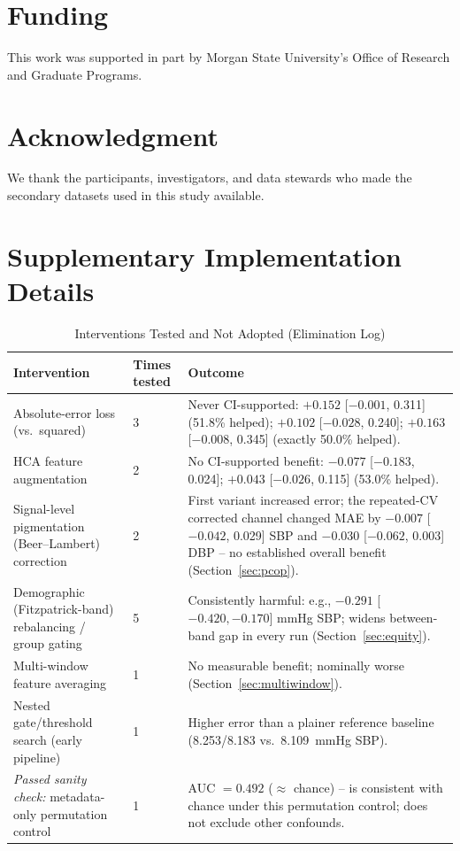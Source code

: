 \documentclass[journal]{IEEEtran}
\begin{document}
\section*{Funding}
This work was supported in part by Morgan State University's Office of Research and Graduate Programs.
\section*{Acknowledgment}
We thank the participants, investigators, and data stewards who made the secondary datasets used in this study available.



\ifdefined\INCLUDECOMBINEDSUPPLEMENT
\clearpage
\normalfont\normalsize
\appendices
\section{Supplementary Implementation Details}
\label{app:implementation}
\setcounter{table}{0}
\setcounter{figure}{0}

\begin{table}[t]
\centering
\caption{Interventions Tested and Not Adopted (Elimination Log)}
\label{tab:whatdidnotwork}
\begin{tabular}{p{4.6cm}p{2.4cm}p{7.8cm}}
\toprule
Intervention & Times tested & Outcome \\
\midrule
Absolute-error loss (vs.\ squared) & 3 & Never CI-supported: $+0.152$ [$-0.001$, 0.311] (51.8\% helped); $+0.102$ [$-0.028$, 0.240]; $+0.163$ [$-0.008$, 0.345] (exactly 50.0\% helped). \\
HCA feature augmentation & 2 & No CI-supported benefit: $-0.077$ [$-0.183$, 0.024]; $+0.043$ [$-0.026$, 0.115] (53.0\% helped). \\
Signal-level pigmentation (Beer--Lambert) correction & 2 & First variant increased error; the repeated-CV corrected channel changed MAE by $-0.007$ [$-0.042$, 0.029] SBP and $-0.030$ [$-0.062$, 0.003] DBP -- no established overall benefit (Section~\ref{sec:pcop}). \\
Demographic (Fitzpatrick-band) rebalancing / group gating & 5 & Consistently harmful: e.g., $-0.291$ [$-0.420,-0.170]$ mmHg SBP; widens between-band gap in every run (Section~\ref{sec:equity}). \\
Multi-window feature averaging & 1 & No measurable benefit; nominally worse (Section~\ref{sec:multiwindow}). \\
Nested gate/threshold search (early pipeline) & 1 & Higher error than a plainer reference baseline (8.253/8.183 vs.\ 8.109~mmHg SBP). \\
\midrule
\emph{Passed sanity check:} metadata-only permutation control & 1 & AUC $=0.492$ ($\approx$ chance) -- is consistent with chance under this permutation control; does not exclude other confounds. \\
\bottomrule
\end{tabular}
\end{table}
\end{document}

